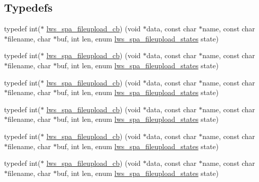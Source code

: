 \subsection*{Typedefs}
\begin{DoxyCompactItemize}
\item 
typedef int($\ast$ \hyperlink{group__form-parsing_ga5a70527c0861c2ffa3d29333a6aa7f8e}{lws\+\_\+spa\+\_\+fileupload\+\_\+cb}) (void $\ast$data, const char $\ast$name, const char $\ast$filename, char $\ast$buf, int len, enum \hyperlink{group__form-parsing_ga41a74a822771d3dce89751aa3bce28ae}{lws\+\_\+spa\+\_\+fileupload\+\_\+states} state)
\item 
typedef int($\ast$ \hyperlink{group__form-parsing_ga5a70527c0861c2ffa3d29333a6aa7f8e}{lws\+\_\+spa\+\_\+fileupload\+\_\+cb}) (void $\ast$data, const char $\ast$name, const char $\ast$filename, char $\ast$buf, int len, enum \hyperlink{group__form-parsing_ga41a74a822771d3dce89751aa3bce28ae}{lws\+\_\+spa\+\_\+fileupload\+\_\+states} state)
\item 
typedef int($\ast$ \hyperlink{group__form-parsing_ga5a70527c0861c2ffa3d29333a6aa7f8e}{lws\+\_\+spa\+\_\+fileupload\+\_\+cb}) (void $\ast$data, const char $\ast$name, const char $\ast$filename, char $\ast$buf, int len, enum \hyperlink{group__form-parsing_ga41a74a822771d3dce89751aa3bce28ae}{lws\+\_\+spa\+\_\+fileupload\+\_\+states} state)
\item 
typedef int($\ast$ \hyperlink{group__form-parsing_ga5a70527c0861c2ffa3d29333a6aa7f8e}{lws\+\_\+spa\+\_\+fileupload\+\_\+cb}) (void $\ast$data, const char $\ast$name, const char $\ast$filename, char $\ast$buf, int len, enum \hyperlink{group__form-parsing_ga41a74a822771d3dce89751aa3bce28ae}{lws\+\_\+spa\+\_\+fileupload\+\_\+states} state)
\item 
typedef int($\ast$ \hyperlink{group__form-parsing_ga5a70527c0861c2ffa3d29333a6aa7f8e}{lws\+\_\+spa\+\_\+fileupload\+\_\+cb}) (void $\ast$data, const char $\ast$name, const char $\ast$filename, char $\ast$buf, int len, enum \hyperlink{group__form-parsing_ga41a74a822771d3dce89751aa3bce28ae}{lws\+\_\+spa\+\_\+fileupload\+\_\+states} state)
\item 
typedef int($\ast$ \hyperlink{group__form-parsing_ga5a70527c0861c2ffa3d29333a6aa7f8e}{lws\+\_\+spa\+\_\+fileupload\+\_\+cb}) (void $\ast$data, const char $\ast$name, const char $\ast$filename, char $\ast$buf, int len, enum \hyperlink{group__form-parsing_ga41a74a822771d3dce89751aa3bce28ae}{lws\+\_\+spa\+\_\+fileupload\+\_\+states} state)
\item 

\end{DoxyCompactItemize}
